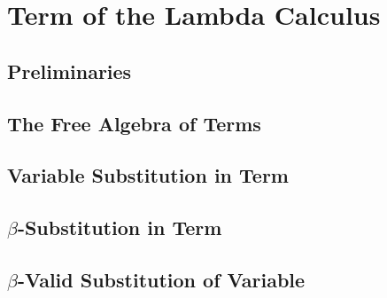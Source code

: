 \section{Term of the Lambda Calculus}
    \subsection{Preliminaries}
        
    \subsection{The Free Algebra of Terms}
        
    \subsection{Variable Substitution in Term}
        
    \subsection{$\beta$-Substitution in Term}
        
    \subsection{$\beta$-Valid Substitution of Variable}
        

